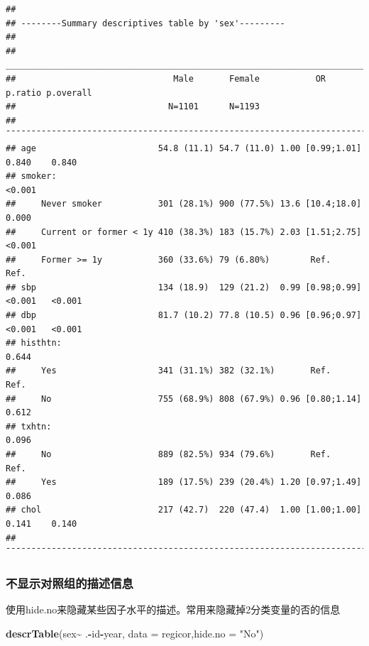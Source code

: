 \documentclass[
]{article}
\newenvironment{Shaded}{\begin{snugshade}}{\end{snugshade}}
\newcommand{\AttributeTok}[1]{\textcolor[rgb]{0.13,0.29,0.53}{#1}}
\newcommand{\FunctionTok}[1]{\textcolor[rgb]{0.13,0.29,0.53}{\textbf{#1}}}
\newcommand{\NormalTok}[1]{#1}
\newcommand{\SpecialCharTok}[1]{\textcolor[rgb]{0.81,0.36,0.00}{\textbf{#1}}}
\newcommand{\StringTok}[1]{\textcolor[rgb]{0.31,0.60,0.02}{#1}}
\begin{document}
\begin{verbatim}
## 
## --------Summary descriptives table by 'sex'---------
## 
## _____________________________________________________________________________________ 
##                               Male       Female           OR        p.ratio p.overall 
##                              N=1101      N=1193                                       
## ¯¯¯¯¯¯¯¯¯¯¯¯¯¯¯¯¯¯¯¯¯¯¯¯¯¯¯¯¯¯¯¯¯¯¯¯¯¯¯¯¯¯¯¯¯¯¯¯¯¯¯¯¯¯¯¯¯¯¯¯¯¯¯¯¯¯¯¯¯¯¯¯¯¯¯¯¯¯¯¯¯¯¯¯¯ 
## age                        54.8 (11.1) 54.7 (11.0) 1.00 [0.99;1.01]  0.840    0.840   
## smoker:                                                                      <0.001   
##     Never smoker           301 (28.1%) 900 (77.5%) 13.6 [10.4;18.0]  0.000            
##     Current or former < 1y 410 (38.3%) 183 (15.7%) 2.03 [1.51;2.75] <0.001            
##     Former >= 1y           360 (33.6%) 79 (6.80%)        Ref.        Ref.             
## sbp                        134 (18.9)  129 (21.2)  0.99 [0.98;0.99] <0.001   <0.001   
## dbp                        81.7 (10.2) 77.8 (10.5) 0.96 [0.96;0.97] <0.001   <0.001   
## histhtn:                                                                      0.644   
##     Yes                    341 (31.1%) 382 (32.1%)       Ref.        Ref.             
##     No                     755 (68.9%) 808 (67.9%) 0.96 [0.80;1.14]  0.612            
## txhtn:                                                                        0.096   
##     No                     889 (82.5%) 934 (79.6%)       Ref.        Ref.             
##     Yes                    189 (17.5%) 239 (20.4%) 1.20 [0.97;1.49]  0.086            
## chol                       217 (42.7)  220 (47.4)  1.00 [1.00;1.00]  0.141    0.140   
## ¯¯¯¯¯¯¯¯¯¯¯¯¯¯¯¯¯¯¯¯¯¯¯¯¯¯¯¯¯¯¯¯¯¯¯¯¯¯¯¯¯¯¯¯¯¯¯¯¯¯¯¯¯¯¯¯¯¯¯¯¯¯¯¯¯¯¯¯¯¯¯¯¯¯¯¯¯¯¯¯¯¯¯¯¯
\end{verbatim}

\subsubsection{\texorpdfstring{\textbf{不显示对照组的描述信息}}{不显示对照组的描述信息}}\label{ux4e0dux663eux793aux5bf9ux7167ux7ec4ux7684ux63cfux8ff0ux4fe1ux606f}

使用hide.no来隐藏某些因子水平的描述。常用来隐藏掉2分类变量的否的信息

\begin{Shaded}
\begin{Highlighting}[]
 \FunctionTok{descrTable}\NormalTok{(}\StringTok{\textasciigrave{}}\AttributeTok{sex}\StringTok{\textasciigrave{}}\SpecialCharTok{\textasciitilde{}}\NormalTok{ .}\SpecialCharTok{{-}}\NormalTok{id}\SpecialCharTok{{-}}\NormalTok{year, }\AttributeTok{data =}\NormalTok{ regicor,}\AttributeTok{hide.no =} \StringTok{"No"}\NormalTok{)}
\end{Highlighting}
\end{Shaded}
\end{document}
